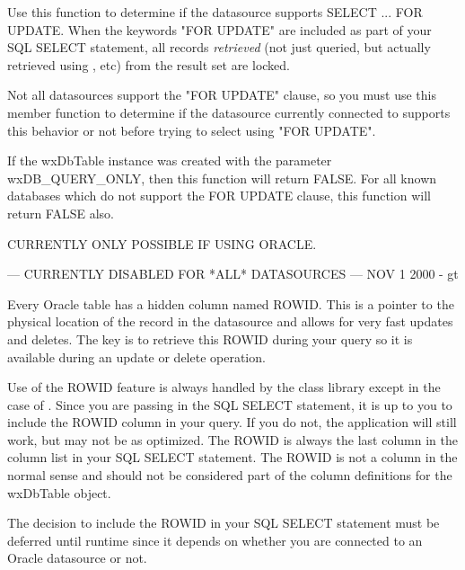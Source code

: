 
Use this function to determine if the datasource supports SELECT ... FOR UPDATE.
When the keywords "FOR UPDATE" are included as part of your SQL SELECT statement,
all records {\it retrieved} (not just queried, but actually retrieved using
, etc) from the result set are
locked.


Not all datasources support the "FOR UPDATE" clause, so you must use this
member function to determine if the datasource currently connected to supports
this behavior or not before trying to select using "FOR UPDATE".

If the wxDbTable instance was created with the parameter wxDB\_QUERY\_ONLY, then
this function will return FALSE.  For all known databases which do not support
the FOR UPDATE clause, this function will return FALSE also.

\label{wxdbtablecanupdatebyrowid}


CURRENTLY ONLY POSSIBLE IF USING ORACLE.

--- CURRENTLY DISABLED FOR *ALL* DATASOURCES --- NOV 1 2000 - gt

Every Oracle table has a hidden column named ROWID.  This is a pointer to the
physical location of the record in the datasource and allows for very fast
updates and deletes.  The key is to retrieve this ROWID during your query so
it is available during an update or delete operation.

Use of the ROWID feature is always handled by the class library except in the
case of .  Since
you are passing in the SQL SELECT statement,
it is up to you to include the ROWID column in your query.  If you do not,
the application will still work, but may not be as optimized.  The ROWID is
always the last column in the column list in your SQL SELECT statement.
The ROWID is not a column in the normal sense and should not be considered
part of the column definitions for the wxDbTable object.


The decision to include the ROWID in your SQL SELECT statement must be
deferred until runtime since it depends on whether you are connected
to an Oracle datasource or not.

